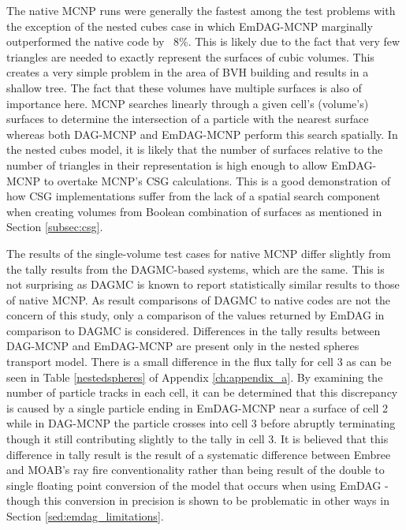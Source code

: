 The native MCNP runs were generally the fastest among the test problems with the
exception of the nested cubes case in which EmDAG-MCNP marginally outperformed
the native code by ~8\%. This is likely due to the fact that very few triangles
are needed to exactly represent the surfaces of cubic volumes. This creates a
very simple problem in the area of BVH building and results in a shallow
tree. The fact that these volumes have multiple surfaces is also of importance
here. MCNP searches linearly through a given cell's (volume's) surfaces to
determine the intersection of a particle with the nearest surface whereas both
DAG-MCNP and EmDAG-MCNP perform this search spatially. In the nested cubes
model, it is likely that the number of surfaces relative to the number of
triangles in their representation is high enough to allow EmDAG-MCNP to overtake
MCNP's CSG calculations. This is a good demonstration of how CSG implementations
suffer from the lack of a spatial search component when creating volumes from
Boolean combination of surfaces as mentioned in Section \ref{subsec:csg}.


The results of the single-volume test cases for native MCNP differ slightly from
the tally results from the DAGMC-based systems, which are the same. This is not
surprising as DAGMC is known to report statistically similar results to those of
native MCNP. As result comparisons of DAGMC to native codes are not the concern
of this study, only a comparison of the values returned by EmDAG in comparison
to DAGMC is considered. Differences in the tally results between DAG-MCNP and
EmDAG-MCNP are present only in the nested spheres transport model. There is a
small difference in the flux tally for cell 3 as can be seen in Table
\ref{nestedspheres} of Appendix \ref{ch:appendix_a}. By examining the number of
particle tracks in each cell, it can be determined that this discrepancy is
caused by a single particle ending in EmDAG-MCNP near a surface of cell 2 while
in DAG-MCNP the particle crosses into cell 3 before abruptly terminating though
it still contributing slightly to the tally in cell 3. It is believed that this
difference in tally result is the result of a systematic difference between
Embree and MOAB's ray fire conventionality rather than being result of the
double to single floating point conversion of the model that occurs when using
EmDAG - though this conversion in precision is shown to be problematic in other
ways in Section \ref{sed:emdag_limitations}.

